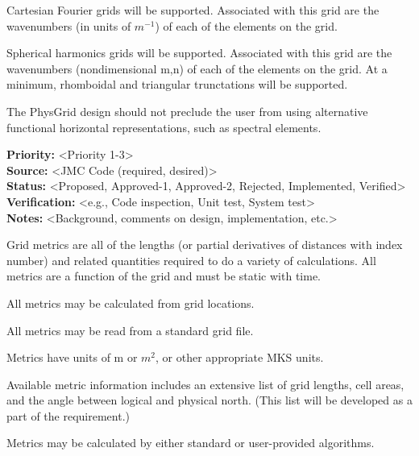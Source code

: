 
Cartesian Fourier grids will be supported.  Associated with this grid are the
wavenumbers (in units of $m^{-1}$) of each of the elements on the grid.


Spherical harmonics grids will be supported.  Associated with this grid are the
wavenumbers (nondimensional m,n) of each of the elements on the grid.  At a
minimum, rhomboidal and triangular trunctations will be supported.


The PhysGrid design should not preclude the user from using alternative
functional horizontal representations, such as spectral elements.

\begin{reqlist}
{\bf Priority:} <Priority 1-3> \\
{\bf Source:} <JMC Code (required, desired)> \\
{\bf Status:} <Proposed, Approved-1, Approved-2, Rejected, Implemented, Verified> \\
{\bf Verification:} <e.g., Code inspection, Unit test, System test> \\
{\bf Notes:} <Background, comments on design, implementation, etc.> 
\end{reqlist}

Grid metrics are all of the lengths (or partial derivatives of distances with
index number) and related quantities required to do a variety of calculations. 
All metrics are a function of the grid and must be static with time.

All metrics may be calculated from grid locations.

All metrics may be read from a standard grid file.

Metrics have units of m or $m^2$, or other appropriate MKS units.

Available metric information includes an extensive list of grid lengths, cell
areas, and the angle between logical and physical north.  (This list will be
developed as a part of the requirement.)

Metrics may be calculated by either standard or user-provided algorithms. 


